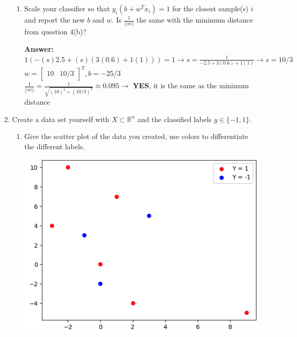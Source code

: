 \documentclass{assignment}
\newcommand{\R}{\mathbb{R}}
\begin{document}
\begin{problem}
\begin{enumerate}
\begin{enumerate}[label=(\alph*)]

        
        \item Scale your classifier so that $y_i(b + w^Tx_i) = 1$ for the closest sample(s) $i$ and report the new $b$ and $w$. Is $\frac{1}{||w||}$ the same with the minimum distance from question 4(b)?

        \color{blue}\textbf{Answer:} $1(-(s)2.5 + (s)(3(0.6) + 1(1))) = 1 \rightarrow s = \frac{1}{-2.5 + 3(0.6) + 1(1)} \rightarrow s = 10/3$\\
        $w = \begin{bmatrix}10 & 10/3\end{bmatrix}^T, b = -25/3$\\
        $\frac{1}{||w||} = \frac{1}{\sqrt{(10)^2 + (10/3)^2}} \approx 0.095 \rightarrow$ \textbf{YES}, it is the same as the minimum distance \color{black}


    \end{enumerate}


    \item Create a data set yourself with $X \subset \R^n$ and the classified labels $y \in \{-1, 1\}$.
    
    \begin{enumerate}[label=(\alph*)]

    
        \item Give the scatter plot of the data you created, use colors to differentiate the different labels.

        \includegraphics[scale=.4]{474-HW4-Q5-a.png}


\end{enumerate}
\end{enumerate}
\end{problem}
\end{document}
